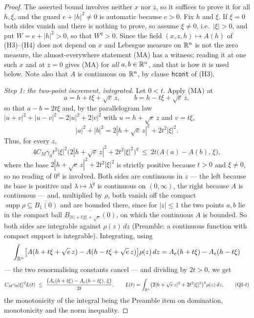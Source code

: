 \begin{proof}
The asserted bound involves neither $x$ nor $z$, so it suffices to prove it for
all $h,\xi$, and the guard $e+|h|^2\ne0$ is automatic because $e>0$.  Fix $h$
and $\xi$.  If $\xi=0$ both sides vanish and there is nothing to prove, so
assume $\xi\ne0$, i.e.\ $|\xi|>0$, and put $W=e+|h|^2>0$, so that $W^{q}>0$.
Since the field $(x,z,h)\mapsto A(h)$ of (H3)--(H4) does not depend on $x$ and
Lebesgue measure on $\mathbb{R}^n$ is not the zero measure, the almost-everywhere
statement (MA) has a witness; reading it at one such $x$ and at $z=0$ gives (MA)
for \emph{all} $a,b\in\mathbb{R}^n$, and that is how it is used below.  Note also that
$A$ is continuous on $\mathbb{R}^n$, by clause \texttt{hcont} of (H3).

\emph{Step 1: the two-point increment, integrated.}  Let $0<t$.  Apply (MA) at
\[
a=h+t\xi+\sqrt e\,z,\qquad b=h-t\xi+\sqrt e\,z ,
\]
so that $a-b=2t\xi$ and, by the parallelogram law
$|u+v|^2+|u-v|^2=2|u|^2+2|v|^2$ with $u=h+\sqrt e\,z$ and $v=t\xi$,
\[
|a|^2+|b|^2=2|h+\sqrt e\,z|^2+2t^2|\xi|^2 .
\]
Thus, for every $z$,
\[
4C_M\gamma_0t^2|\xi|^2
\bigl(2|h+\sqrt e\,z|^2+2t^2|\xi|^2\bigr)^{q}
\ \le\ 2t\bigl(A(a)-A(b),\,\xi\bigr),
\]
where the base $2|h+\sqrt e\,z|^2+2t^2|\xi|^2$ is strictly positive because
$t>0$ and $\xi\ne0$, so no reading of $0^{q}$ is involved.  Both sides are
continuous in $z$ --- the left because its base is positive and
$\lambda\mapsto\lambda^{q}$ is continuous on $(0,\infty)$, the right because $A$
is continuous --- and, multiplied by $\rho$, both vanish off the compact
$\operatorname{supp}\rho\subseteq\overline{B_1(0)}$ and are bounded there, since
for $|z|\le1$ the two points $a,b$ lie in the compact ball
$\overline{B_{|h|+t|\xi|+\sqrt e}(0)}$, on which the continuous $A$ is bounded.
So both sides are integrable against $\rho(z)\,dz$ (Preamble: a continuous
function with compact support is integrable).  Integrating, using
\[
\int_{\mathbb{R}^n}\bigl[A(h+t\xi+\sqrt e\,z)-A(h-t\xi+\sqrt e\,z)\bigr]\rho(z)\,dz
=A_e(h+t\xi)-A_e(h-t\xi)
\]
--- the two renormalising constants cancel --- and dividing by $2t>0$, we get
\[
C_M\gamma_0|\xi|^2L(t)
\ \le\ \frac{\bigl(A_e(h+t\xi)-A_e(h-t\xi),\,\xi\bigr)}{2t},
\qquad
L(t)=\int_{\mathbb{R}^n}\bigl(2|h+\sqrt e\,z|^2+2t^2|\xi|^2\bigr)^{q}\rho(z)\,dz ,
\tag{Q1-$t$}
\]
the monotonicity of the integral being the Preamble item on domination,
monotonicity and the norm inequality.


\end{proof}

